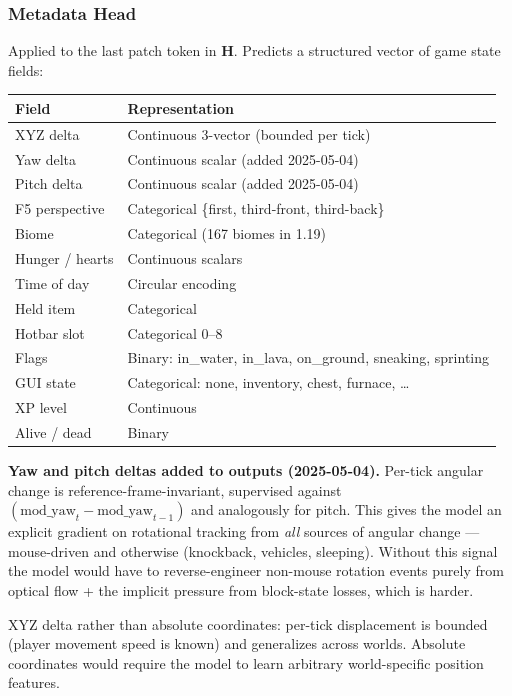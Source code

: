 \documentclass[11pt,a4paper]{article}
\begin{document}
\subsubsection{Metadata Head}

Applied to the last patch token in $\mathbf{H}$. Predicts a structured vector of game state fields:

\begin{center}
\begin{tabular}{ll}
\toprule
Field & Representation \\
\midrule
XYZ delta & Continuous 3-vector (bounded per tick) \\
Yaw delta & Continuous scalar (added 2025-05-04) \\
Pitch delta & Continuous scalar (added 2025-05-04) \\
F5 perspective & Categorical \{first, third-front, third-back\} \\
Biome & Categorical (167 biomes in 1.19) \\
Hunger / hearts & Continuous scalars \\
Time of day & Circular encoding \\
Held item & Categorical \\
Hotbar slot & Categorical 0--8 \\
Flags & Binary: in\_water, in\_lava, on\_ground, sneaking, sprinting \\
GUI state & Categorical: none, inventory, chest, furnace, \ldots \\
XP level & Continuous \\
Alive / dead & Binary \\
\bottomrule
\end{tabular}
\end{center}

\begin{designdecision}
\textbf{Yaw and pitch deltas added to outputs (2025-05-04).} Per-tick angular change is reference-frame-invariant, supervised against $(\text{mod\_yaw}_t - \text{mod\_yaw}_{t-1})$ and analogously for pitch. This gives the model an explicit gradient on rotational tracking from \textit{all} sources of angular change --- mouse-driven and otherwise (knockback, vehicles, sleeping). Without this signal the model would have to reverse-engineer non-mouse rotation events purely from optical flow + the implicit pressure from block-state losses, which is harder.
\end{designdecision}

\begin{designdecision}
XYZ delta rather than absolute coordinates: per-tick displacement is bounded (player movement speed is known) and generalizes across worlds. Absolute coordinates would require the model to learn arbitrary world-specific position features.
\end{designdecision}
\end{document}
